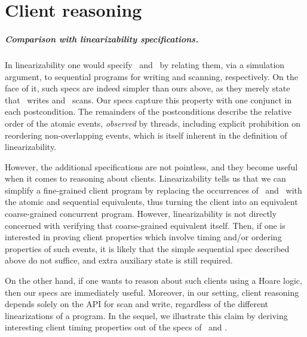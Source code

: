 \section{Client reasoning}
\label{sc:clients}


\subparagraph*{Comparison with linearizability specifications.}
%
In linearizability one would specify \jywrite\ and \jyscan\ by
relating them, via a simulation argument, to sequential programs for
writing and scanning, respectively. On the face of it, such specs are
indeed simpler than ours above, as they merely state that \jywrite\
writes and \jyscan\ scans. Our specs capture this property with one
conjunct in each postcondition. The remainders of the postconditions
describe the relative order of the atomic events, \emph{observed} by
threads, including explicit prohibition on reordering non-overlapping
events, which is itself inherent in the definition of linearizability.

However, the additional specifications are not pointless, and they
become useful when it comes to reasoning about
clients. Linearizability tells us that we can simplify a fine-grained
client program by replacing the occurrences of \jywrite\ and
\jyscan\ with the atomic and sequential equivalents, thus turning the
client into an equivalent coarse-grained concurrent program. However,
linearizability is not directly concerned with verifying that
coarse-grained equivalent itself.
%
%
%
Then, if one is interested in proving client properties which involve
timing and/or ordering properties of such events, it is likely that
the simple sequential spec described above do not suffice, and extra
auxiliary state is still required.

On the other hand, if one wants to reason about such clients using a
Hoare logic, then our specs are immediately useful. Moreover, in our
setting, client reasoning depends solely on the API for scan and
write, regardless of the different linearizations of a program. In the
sequel, we illustrate this claim by deriving interesting client timing
properties out of the specs of \jywrite\ and \jyscan.


